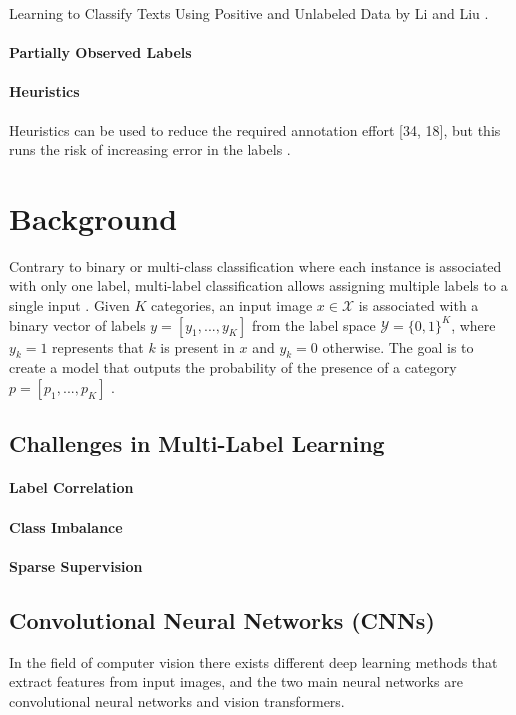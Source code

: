 \documentclass[lettersize,journal]{IEEEtran}
\begin{document}
Learning to Classify Texts Using Positive and Unlabeled Data by Li and Liu \cite{Li_2003}.

\paragraph{Partially Observed Labels}

\paragraph{Heuristics}
Heuristics can be used to reduce the required
annotation effort [34, 18], but this runs the risk of increasing
error in the labels \cite{mlsp}.

\section{Background}
Contrary to binary or multi-class classification where each instance is associated with only one label, multi-label classification allows assigning multiple labels to a single input \cite{mlsp}. Given $K$ categories, an input image $x\in \mathcal{X}$ is associated with a binary vector of labels $y=[y_1,...,y_K]$ from the label space $\mathcal{Y}=\{0,1\}^K$, where $y_k=1$ represents that $k$ is present in $x$ and $y_k=0$ otherwise. The goal is to create a model that outputs the probability of the presence of a category $p=[p_1,...,p_K]$ \cite{mlsp,Query2Label}.

\subsection{Challenges in Multi-Label Learning}
\paragraph{Label Correlation}
\paragraph{Class Imbalance}
\paragraph{Sparse Supervision}



\subsection{Convolutional Neural Networks (CNNs)}
In the field of computer vision there exists different deep learning methods that extract features from input images, and the two main neural networks are convolutional neural networks and vision transformers. 
\end{document}
